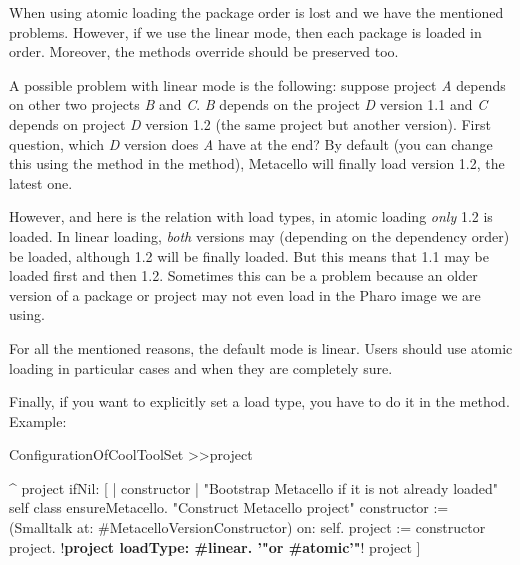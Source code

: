\documentclass[a4paper,10pt,twoside]{book}
\begin{document}
When using atomic loading the package order is lost and we have the mentioned problems. However, if we use the linear mode, then each package is loaded in order. Moreover, the methods override should be preserved too. 

A possible problem with linear mode is the following: suppose project \emph{A} depends on other two projects \emph{B} and \emph{C}. \emph{B} depends on the project \emph{D} version 1.1 and \emph{C} depends on project \emph{D} version 1.2 (the same project but another version). First question, which \emph{D} version does \emph{A} have at the end?  By default (you can change this using the method  in the  method), Metacello will finally load version 1.2, \ie the latest one.

However, and here is the relation with load types, in atomic loading \emph{only} 1.2 is loaded. In linear loading, \emph{both} versions may (depending on the dependency order) be loaded, although 1.2 will be finally loaded. But this means that 1.1 may be loaded first and then 1.2. Sometimes this can be a problem because an older version of a package or project may not even load in the Pharo image we are using. 

For all the mentioned reasons, the default mode is linear. Users should use atomic loading in particular cases and when they are completely sure. 

Finally, if you want to explicitly set a load type, you have to do it in the  method. Example:

\begin{code}{}
ConfigurationOfCoolToolSet >>project

       ^ project ifNil: [ | constructor |
              "Bootstrap Metacello if it is not already loaded"
              self class ensureMetacello.
              "Construct Metacello project"
              constructor := (Smalltalk at: #MetacelloVersionConstructor) on: self.
              project := constructor project.
              !\textbf{project loadType: \#linear. '"or \#atomic'"}!
              project ]

\end{code}
\end{document}
